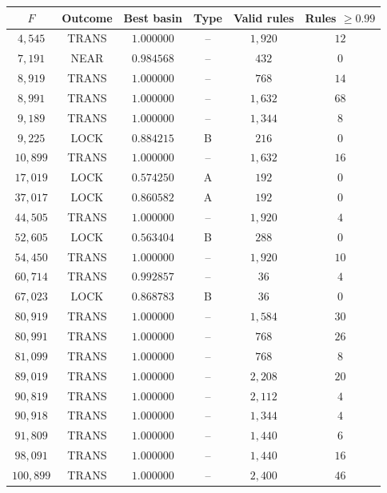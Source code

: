 \documentclass[11pt,letterpaper]{article}
\theoremstyle{paperstyle}
\theoremstyle{paperstyledef}
\theoremstyle{paperstylerem}
\begin{document}
\begin{longtable}[]{@{}cccccc@{}}
\toprule\noalign{}
\(F\) & Outcome & Best basin & Type & Valid rules & Rules
\(\geq 0.99\) \\
\midrule\noalign{}
\endhead
\bottomrule\noalign{}
\endlastfoot
\(4{,}545\) & TRANS & \(1.000000\) & -- & \(1{,}920\) & \(12\) \\
\(7{,}191\) & NEAR & \(0.984568\) & -- & \(432\) & \(0\) \\
\(8{,}919\) & TRANS & \(1.000000\) & -- & \(768\) & \(14\) \\
\(8{,}991\) & TRANS & \(1.000000\) & -- & \(1{,}632\) & \(68\) \\
\(9{,}189\) & TRANS & \(1.000000\) & -- & \(1{,}344\) & \(8\) \\
\(9{,}225\) & LOCK & \(0.884215\) & B & \(216\) & \(0\) \\
\(10{,}899\) & TRANS & \(1.000000\) & -- & \(1{,}632\) & \(16\) \\
\(17{,}019\) & LOCK & \(0.574250\) & A & \(192\) & \(0\) \\
\(37{,}017\) & LOCK & \(0.860582\) & A & \(192\) & \(0\) \\
\(44{,}505\) & TRANS & \(1.000000\) & -- & \(1{,}920\) & \(4\) \\
\(52{,}605\) & LOCK & \(0.563404\) & B & \(288\) & \(0\) \\
\(54{,}450\) & TRANS & \(1.000000\) & -- & \(1{,}920\) & \(10\) \\
\(60{,}714\) & TRANS & \(0.992857\) & -- & \(36\) & \(4\) \\
\(67{,}023\) & LOCK & \(0.868783\) & B & \(36\) & \(0\) \\
\(80{,}919\) & TRANS & \(1.000000\) & -- & \(1{,}584\) & \(30\) \\
\(80{,}991\) & TRANS & \(1.000000\) & -- & \(768\) & \(26\) \\
\(81{,}099\) & TRANS & \(1.000000\) & -- & \(768\) & \(8\) \\
\(89{,}019\) & TRANS & \(1.000000\) & -- & \(2{,}208\) & \(20\) \\
\(90{,}819\) & TRANS & \(1.000000\) & -- & \(2{,}112\) & \(4\) \\
\(90{,}918\) & TRANS & \(1.000000\) & -- & \(1{,}344\) & \(4\) \\
\(91{,}809\) & TRANS & \(1.000000\) & -- & \(1{,}440\) & \(6\) \\
\(98{,}091\) & TRANS & \(1.000000\) & -- & \(1{,}440\) & \(16\) \\
\(100{,}899\) & TRANS & \(1.000000\) & -- & \(2{,}400\) & \(46\) \\

\end{longtable}
\end{document}
